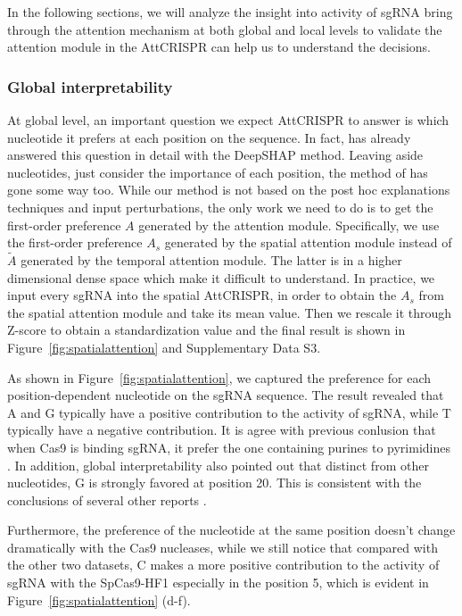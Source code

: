 \documentclass{bioinfo}
\begin{document}
In the following sections, we will analyze the insight into activity of sgRNA bring through the attention mechanism at both global and local levels 
to validate the attention module in the AttCRISPR can help us to understand the decisions. 

\subsubsection{Global interpretability}

At global level, an important question we expect AttCRISPR to answer is which nucleotide it prefers at each position on the sequence. 
In fact, \citeauthor{wang2019optimized} has already answered this question in detail with the DeepSHAP method.
Leaving aside nucleotides, just consider the importance of each position, the method of \citeauthor{Liu2019} has gone some way too. 
While our method is not based on the post hoc explanations techniques and input perturbations, the only work we need to do is to get the first-order preference $A$ generated by the attention module.
Specifically, we use the first-order preference $A_s$ generated by the spatial attention module instead of  $\tilde{A}$ generated by the temporal attention module. 
The latter is in a higher dimensional dense space which make it difficult to understand. 
In practice, we input every sgRNA into the spatial AttCRISPR, in order to obtain the $A_s$ from the spatial attention module and take its mean value. 
Then we rescale it through Z-score to obtain a standardization value and the final result is shown in Figure~\ref{fig:spatialattention} and Supplementary Data S3. 

As shown in Figure~\ref{fig:spatialattention}, we captured the preference for each position-dependent nucleotide on the sgRNA sequence. 
The result revealed that A and G typically have a positive contribution to the activity of sgRNA, while T typically have a negative contribution. 
It is agree with previous conlusion that when Cas9 is binding sgRNA, it prefer the one containing purines to pyrimidines \citep{wang2014genetic}. 
In addition, global interpretability also pointed out that distinct from other nucleotides, G is strongly favored at position 20. 
This is consistent with the conclusions of several other reports \citep{Wong2015,Doench2014}.

Furthermore, the preference of the nucleotide at the same position doesn't change dramatically with the Cas9 nucleases, 
while we still notice that compared with the other two datasets, 
C makes a more positive contribution to the activity of sgRNA with the SpCas9-HF1 especially in the position 5, which is evident in Figure~\ref{fig:spatialattention} (d-f). 
\end{document}
